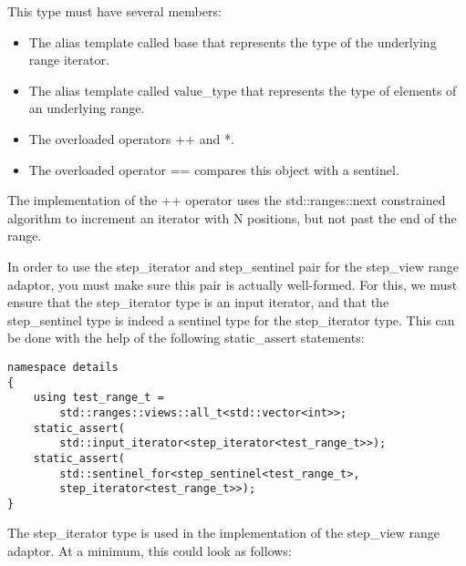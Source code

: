 This type must have several members:

\begin{itemize}
\item
The alias template called base that represents the type of the underlying range iterator.

\item
The alias template called value\_type that represents the type of elements of an underlying range.

\item
The overloaded operators ++ and *.

\item
The overloaded operator == compares this object with a sentinel.
\end{itemize}

The implementation of the ++ operator uses the std::ranges::next constrained algorithm to increment an iterator with N positions, but not past the end of the range.

In order to use the step\_iterator and step\_sentinel pair for the step\_view range adaptor, you must make sure this pair is actually well-formed. For this, we must ensure that the step\_iterator type is an input iterator, and that the step\_sentinel type is indeed a sentinel type for the step\_iterator type. This can be done with the help of the following static\_assert statements:

\begin{lstlisting}[style=styleCXX]
namespace details
{
	using test_range_t =
		std::ranges::views::all_t<std::vector<int>>;
	static_assert(
		std::input_iterator<step_iterator<test_range_t>>);
	static_assert(
		std::sentinel_for<step_sentinel<test_range_t>,
		step_iterator<test_range_t>>);
}
\end{lstlisting}

The step\_iterator type is used in the implementation of the step\_view range adaptor. At a minimum, this could look as follows:


